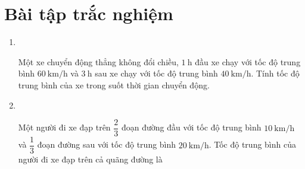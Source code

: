 \let\lesson\undefined
\newcommand{\lesson}{\phantomlesson{Bài 4.}}


\setcounter{section}{2}
\section{Bài tập trắc nghiệm}
\begin{enumerate}[label=\bfseries Câu \arabic*:]
	\item {}\\
	{Một xe chuyển động thẳng không đổi chiều, $\SI{1}{\hour}$ đầu xe chạy với tốc độ trung bình $\SI{60}{\kilo\meter/\hour}$ và $\SI{3}{\hour}$ sau xe chạy với tốc độ trung bình $\SI{40}{\kilo\meter/\hour}$. Tính tốc độ trung bình của xe trong suốt thời gian chuyển động.
	}
	
	\item {}\\
	{Một người đi xe đạp trên $\dfrac{2}{3}$ đoạn đường đầu với tốc độ trung bình $\SI{10}{\kilo\meter/\hour}$ và $\dfrac{1}{3}$ đoạn đường sau với tốc độ trung bình $\SI{20}{\kilo\meter/\hour}$. Tốc độ trung bình của người đi xe đạp trên cả quãng đường là
	}
\end{enumerate}

